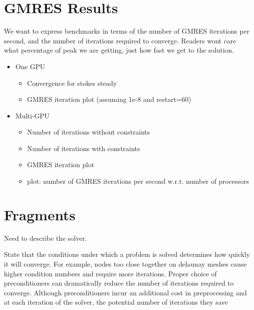 \section{GMRES Results}

We want to express benchmarks in terms of the number of GMRES iterations per second, and the number of iterations required to converge. Readers wont care what percentage of peak we are getting, just how fast we get to the solution. 

\begin{itemize} 
\item One GPU
\begin{itemize} 
	\item {\color{blue} Convergence for stokes steady}  
	\item {\color{blue} GMRES iteration plot (assuming 1e-8 and restart=60)} 
\end{itemize} 
\item Multi-GPU
	\begin{itemize} 
		\item Number of iterations without constraints
		\item Number of iterations with constraints
		\item GMRES iteration plot
		\item plot: number of GMRES iterations per second w.r.t. number of processors
	\end{itemize} 
\end{itemize} 


\section{Fragments}
Need to describe the solver. 

State that the conditions under which a problem is solved determines how quickly it will converge. For example, nodes too close together on delaunay meshes cause higher condition numbers and require more iterations. Proper choice of preconditioners can dramatically reduce the number of iterations required to converge. Although preconditioners incur an additional cost in preprocessing and at each iteration of the solver, the potential number of iterations they save 
